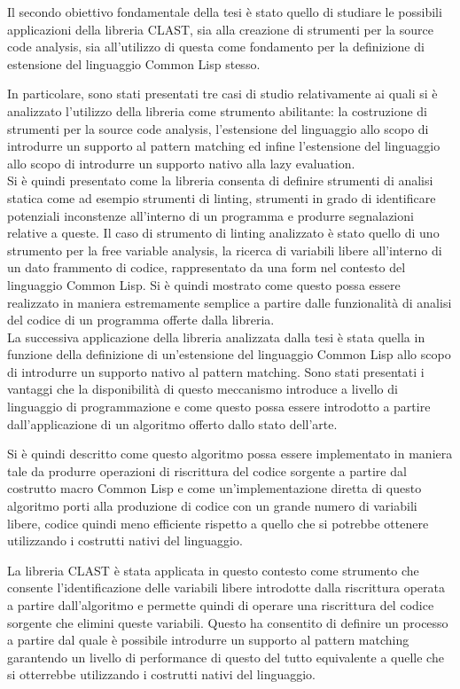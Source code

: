 \documentclass{book}
\begin{document}
Il secondo obiettivo fondamentale della tesi è stato quello di studiare le
possibili applicazioni della libreria CLAST, sia alla creazione di strumenti per
la source code analysis, sia all'utilizzo di questa come fondamento per la
definizione di estensione del linguaggio Common Lisp stesso.

In particolare, sono stati presentati tre casi di studio relativamente ai quali
si è analizzato l'utilizzo della libreria come strumento abilitante: la
costruzione di strumenti per la source code analysis, l'estensione del
linguaggio allo scopo di introdurre un supporto al pattern matching ed infine
l'estensione del linguaggio allo scopo di introdurre un supporto nativo alla
lazy evaluation.\\

Si è quindi presentato come la libreria consenta di definire strumenti di
analisi statica come ad esempio strumenti di linting, strumenti in grado di
identificare potenziali inconstenze all'interno di un programma e produrre
segnalazioni relative a queste. Il caso di strumento di linting analizzato è
stato quello di uno strumento per la free variable analysis, la ricerca di
variabili libere all'interno di un dato frammento di codice, rappresentato da
una form nel contesto del linguaggio Common Lisp. Si è quindi mostrato come
questo possa essere realizzato in maniera estremamente semplice a partire dalle
funzionalità di analisi del codice di un programma offerte dalla libreria.\\

La successiva applicazione della libreria analizzata dalla tesi è stata quella
in funzione della definizione di un'estensione del linguaggio Common Lisp allo
scopo di introdurre un supporto nativo al pattern matching. Sono stati
presentati i vantaggi che la disponibilità di questo meccanismo introduce a
livello di linguaggio di programmazione e come questo possa essere introdotto a
partire dall'applicazione di un algoritmo offerto dallo stato dell'arte.

Si è quindi descritto come questo algoritmo possa essere implementato in maniera
tale da produrre operazioni di riscrittura del codice sorgente a partire dal
costrutto macro Common Lisp e come un'implementazione diretta di questo
algoritmo porti alla produzione di codice con un grande numero di variabili
libere, codice quindi meno efficiente rispetto a quello che si potrebbe ottenere
utilizzando i costrutti nativi del linguaggio.

La libreria CLAST è stata applicata in questo contesto come strumento che
consente l'identificazione delle variabili libere introdotte dalla riscrittura
operata a partire dall'algoritmo e permette quindi di operare una riscrittura
del codice sorgente che elimini queste variabili. Questo ha consentito di
definire un processo a partire dal quale è possibile introdurre un supporto al
pattern matching garantendo un livello di performance di questo del tutto
equivalente a quelle che si otterrebbe utilizzando i costrutti nativi del
linguaggio.\\
\end{document}
